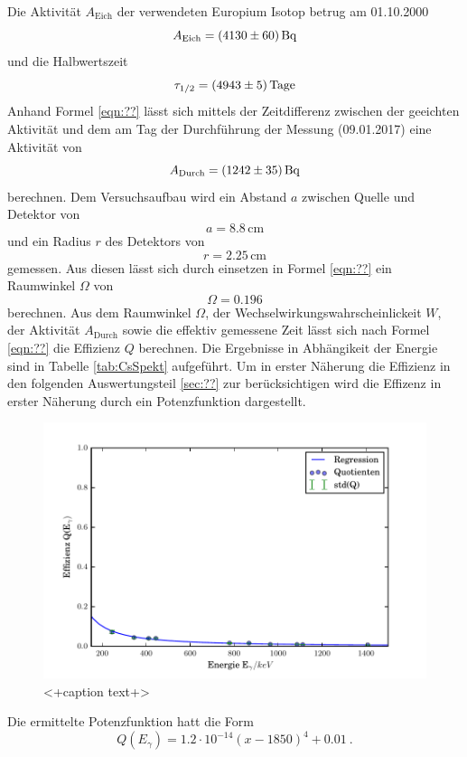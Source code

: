 Die Aktivität $A_\text{Eich}$ der verwendeten Europium Isotop betrug am 01.10.2000
\begin{equation}
  A_\text{Eich} = (\num{4130 +- 60}) \, \text{Bq} 
  \label{eqn:AktEu}
\end{equation}
und die Halbwertszeit
\begin{equation}
  \tau_{1/2} = (\num{4943 +- 5}) \, \text{Tage} 
  \label{eqn:halb}
\end{equation}
Anhand Formel \ref{eqn:??} lässt sich mittels der Zeitdifferenz zwischen der geeichten Aktivität und dem am Tag der Durchführung der Messung (09.01.2017) eine Aktivität von 
\begin{equation}
  A_\text{Durch} = (\num{1242 +- 35}) \, \text{Bq}
  \label{eqn:AktEEu}
\end{equation}
berechnen. Dem Versuchsaufbau wird ein Abstand $a$ zwischen Quelle und Detektor von 
\begin{equation}
  a = 8.8 \, \text{cm}
  \label{<++>}
\end{equation}
und ein Radius $r$ des Detektors von
\begin{equation}
  r = 2.25 \, \text{cm} 
  \label{<++>}
\end{equation}
gemessen. Aus diesen lässt sich durch einsetzen in Formel \ref{eqn:??} ein Raumwinkel $\Omega$ von 
\begin{equation}
  \Omega = 0.196 
  \label{eqn:Raum}
\end{equation}
berechnen. Aus dem Raumwinkel $\Omega$, der Wechselwirkungswahrscheinlickeit $W$, der Aktivität $A_\text{Durch}$ sowie die effektiv gemessene Zeit lässt sich nach Formel \ref{eqn:??} die Effizienz $Q$ berechnen. Die Ergebnisse in Abhängikeit der Energie sind in Tabelle \ref{tab:CsSpekt} aufgeführt. Um in erster Näherung die Effizienz in den folgenden Auswertungsteil \ref{sec:??} zur berücksichtigen wird die Effizenz in erster Näherung durch ein Potenzfunktion dargestellt. 
\begin{figure} 
  \centering
  \includegraphics[width=\textwidth]{./build/Effizienz.pdf}
  \caption{<+caption text+>}
  \label{fig:<+label+>}
\end{figure}
Die ermittelte Potenzfunktion hatt die Form 
\begin{equation}
  Q(E_\gamma)= 1.2 \cdot 10^{-14} \left( x - 1850 \right)^4 + 0.01 \ .
  \label{eqn:QCs}
\end{equation}
